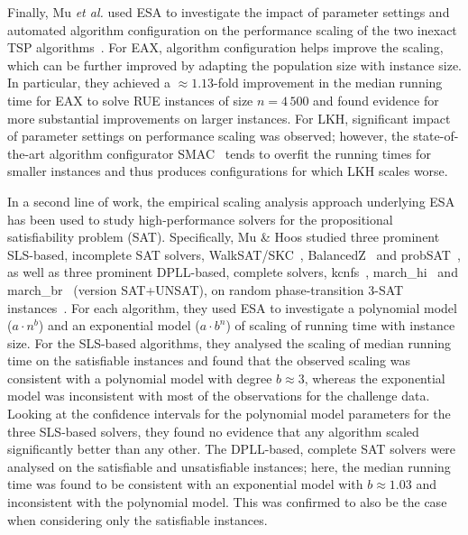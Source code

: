 \documentclass[aic]{iosart2x}
\newcommand{\etal}{\emph{et al.}}
\begin{document}
Finally, Mu \etal{} used ESA to investigate the impact of parameter settings and automated algorithm configuration on the performance scaling of the two inexact TSP algorithms~\cite{MuEtAl16}. 
For EAX, algorithm configuration helps improve the scaling, which can be further improved by adapting the population size with instance size. 
In particular, they achieved a $\approx1.13$-fold improvement in the median running time for EAX to solve RUE instances of size $n=4\,500$ and found evidence for more substantial improvements on larger instances. 
For LKH, significant impact of parameter settings on performance scaling was observed; however, the state-of-the-art algorithm configurator SMAC~\cite{hutter2011sequential} tends to overfit the running times for smaller instances and thus produces configurations for which LKH scales worse.

In a second line of work, the empirical scaling analysis approach underlying ESA has been used to study high-performance solvers for the propositional satisfiability problem (SAT).
Specifically, Mu \& Hoos studied three prominent SLS-based, incomplete SAT solvers, WalkSAT/SKC~\cite{selman1994noise}, BalancedZ~\cite{li2014balance} and probSAT~\cite{balint2014probsat}, as well as three prominent DPLL-based, complete solvers, kcnfs~\cite{dequen2004kcnfs}, march\_hi~\cite{heule2009march} and march\_br~\cite{heule2013march} (version SAT+UNSAT), on random phase-transition 3-SAT instances~\cite{MuHoo15}. 
For each algorithm, they used ESA to investigate a polynomial model ($a\cdot n^b$) and an exponential model ($a\cdot b^n$) of scaling of running time with instance size. 
For the SLS-based algorithms, they analysed the scaling of median running time on the satisfiable instances and found that the observed scaling was consistent with a polynomial model with degree $b \approx 3$, whereas the exponential model was inconsistent with most of the observations for the challenge data. 
Looking at the confidence intervals for the polynomial model parameters for the three SLS-based solvers, they found no evidence that any algorithm scaled significantly better than any other. 
The DPLL-based, complete SAT solvers were analysed on the satisfiable and unsatisfiable instances; here, the median running time was found to be consistent with an exponential model with $b \approx 1.03$ and inconsistent with the polynomial model. 
This was confirmed to also be the case when considering only the satisfiable instances. 
\end{document}
